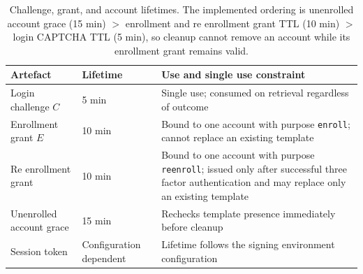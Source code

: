 \documentclass[runningheads]{llncs}
\begin{document}
\begin{table}[!t]
\caption{Challenge, grant, and account lifetimes. The implemented ordering is unenrolled account grace (15 min) $>$ enrollment and re enrollment grant TTL (10 min) $>$ login CAPTCHA TTL (5 min), so cleanup cannot remove an account while its enrollment grant remains valid.}
\label{tab:lifetimes}
\centering
\footnotesize
\renewcommand{\arraystretch}{1.15}
\setlength{\tabcolsep}{4pt}
\begin{tabular}{|p{3.2cm}|p{2.2cm}|p{7.4cm}|}
\hline
\textbf{Artefact} & \textbf{Lifetime} & \textbf{Use and single use constraint} \\ \hline
Login challenge $C$ & 5 min & Single use; consumed on retrieval regardless of outcome \\ \hline
Enrollment grant $E$ & 10 min & Bound to one account with purpose \texttt{enroll}; cannot replace an existing template \\ \hline
Re enrollment grant & 10 min & Bound to one account with purpose \texttt{reenroll}; issued only after successful three factor authentication and may replace only an existing template \\ \hline
Unenrolled account grace & 15 min & Rechecks template presence immediately before cleanup \\ \hline
Session token & Configuration dependent & Lifetime follows the signing environment configuration \\ \hline
\end{tabular}
\end{table}
\end{document}
